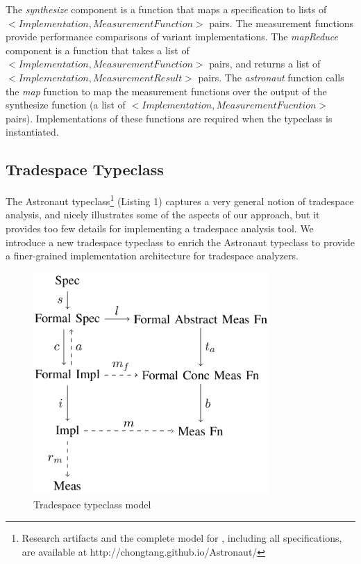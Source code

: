 \documentclass[10pt,conference]{IEEEtran}
\begin{document}
The {\em synthesize} component is a function that maps a specification to lists of $<Implementation, MeasurementFunction>$ pairs. The measurement functions provide performance comparisons of variant implementations. The {\em mapReduce} component is a function that takes a list of $<Implementation, MeasurementFunction>$ pairs, and returns a list of $<Implementation, MeasurementResult>$ pairs. The {\em astronaut} function calls the {\em map} function to map the measurement functions over the output of the synthesize function (a list of $<Implementation, MeasurementFucntion>$ pairs). Implementations of these functions are required when the typeclass is instantiated.

\subsection{Tradespace Typeclass}
The Astronaut typeclass\footnote{Research artifacts and the complete model for \@approach, including all specifications, are available at http://chongtang.github.io/Astronaut/} (Listing 1) captures a very general notion of tradespace analysis, and nicely illustrates some of the aspects of our approach, but it provides too few details for implementing a tradespace analysis tool. We introduce a new tradespace typeclass to enrich the Astronaut typeclass to provide a finer-grained implementation architecture for tradespace analyzers.

\begin{figure}[t!]
\vspace{0.5cm}
\centering
\includegraphics[width=0.8\textwidth]{img/tradespace_model.png}
\caption{Tradespace typeclass model}
\label{fig:tradespace_model}
\end{figure}
\end{document}
